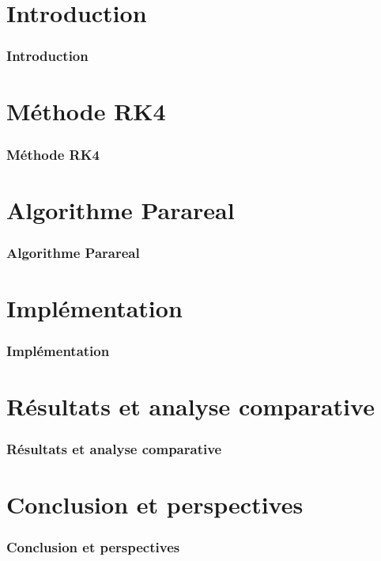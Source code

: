 \documentclass{beamer}
\newcommand{\secframe}[1]{%
    \begin{frame}
        \frametitle{#1}
        \tableofcontents[currentsection]
    \end{frame}
}
\begin{document}


\section{Introduction}
\secframe{Introduction}


\section{Méthode RK4}
\secframe{Méthode RK4}


\section{Algorithme Parareal}
\secframe{Algorithme Parareal}


\section{Implémentation}
\secframe{Implémentation}


\section{Résultats et analyse comparative}
\secframe{Résultats et analyse comparative}


\section{Conclusion et perspectives}
\secframe{Conclusion et perspectives}

\end{document}
